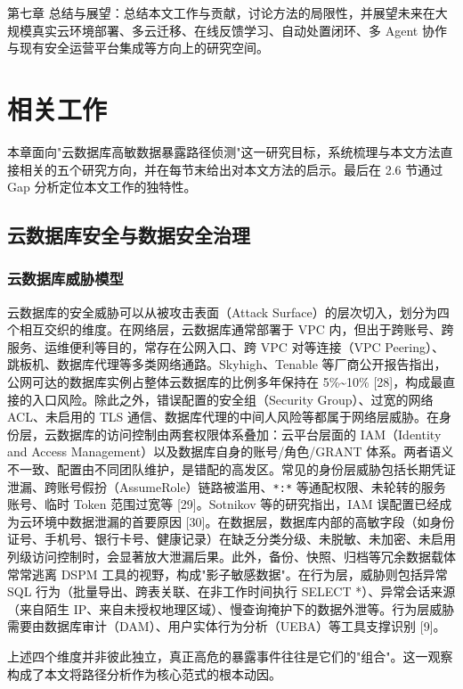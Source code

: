 \documentclass[a4paper,12pt]{ctexart}
\begin{document}
第七章 总结与展望：总结本文工作与贡献，讨论方法的局限性，并展望未来在大规模真实云环境部署、多云迁移、在线反馈学习、自动处置闭环、多 Agent 协作与现有安全运营平台集成等方向上的研究空间。

\section{相关工作}

本章面向"云数据库高敏数据暴露路径侦测"这一研究目标，系统梳理与本文方法直接相关的五个研究方向，并在每节末给出对本文方法的启示。最后在 2.6 节通过 Gap 分析定位本文工作的独特性。

\subsection{云数据库安全与数据安全治理}

\subsubsection{云数据库威胁模型}

云数据库的安全威胁可以从被攻击表面（Attack Surface）的层次切入，划分为四个相互交织的维度。在网络层，云数据库通常部署于 VPC 内，但出于跨账号、跨服务、运维便利等目的，常存在公网入口、跨 VPC 对等连接（VPC Peering）、跳板机、数据库代理等多类网络通路。Skyhigh、Tenable 等厂商公开报告指出，公网可达的数据库实例占整体云数据库的比例多年保持在 5\%\textasciitilde{}10\% [28]，构成最直接的入口风险。除此之外，错误配置的安全组（Security Group）、过宽的网络 ACL、未启用的 TLS 通信、数据库代理的中间人风险等都属于网络层威胁。在身份层，云数据库的访问控制由两套权限体系叠加：云平台层面的 IAM（Identity and Access Management）以及数据库自身的账号/角色/GRANT 体系。两者语义不一致、配置由不同团队维护，是错配的高发区。常见的身份层威胁包括长期凭证泄漏、跨账号假扮（AssumeRole）链路被滥用、\texttt{*:*} 等通配权限、未轮转的服务账号、临时 Token 范围过宽等 [29]。Sotnikov 等的研究指出，IAM 误配置已经成为云环境中数据泄漏的首要原因 [30]。在数据层，数据库内部的高敏字段（如身份证号、手机号、银行卡号、健康记录）在缺乏分类分级、未脱敏、未加密、未启用列级访问控制时，会显著放大泄漏后果。此外，备份、快照、归档等冗余数据载体常常逃离 DSPM 工具的视野，构成"影子敏感数据"。在行为层，威胁则包括异常 SQL 行为（批量导出、跨表关联、在非工作时间执行 SELECT *）、异常会话来源（来自陌生 IP、来自未授权地理区域）、慢查询掩护下的数据外泄等。行为层威胁需要由数据库审计（DAM）、用户实体行为分析（UEBA）等工具支撑识别 [9]。

上述四个维度并非彼此独立，真正高危的暴露事件往往是它们的"组合"。这一观察构成了本文将路径分析作为核心范式的根本动因。
\end{document}
